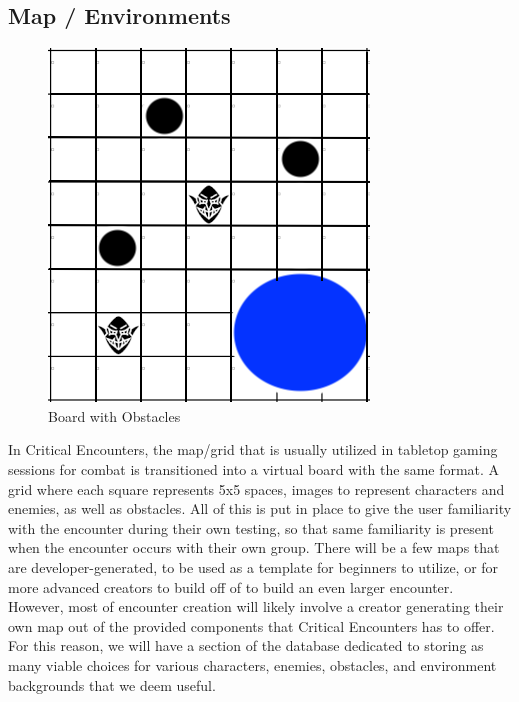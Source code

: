 \documentclass[12pt,a4paper]{report}
\begin{document}
	\newpage
	\subsection{Map / Environments}
		\begin{figure}[H]
		\centering
		\includegraphics[scale=.6]{environment}
		\caption{Board with Obstacles}
		\label{fig: Board with Obstacles}
	\end{figure}
	In Critical Encounters, the map/grid that is usually utilized in tabletop gaming sessions for combat is transitioned into a virtual board with the same format. A grid where each square represents 5x5 spaces, images to represent characters and enemies, as well as obstacles. All of this is put in place to give the user familiarity with the encounter during their own testing, so that same familiarity is present when the encounter occurs with their own group. There will be a few maps that are developer-generated, to be used as a template for beginners to utilize, or for more advanced creators to build off of to build an even larger encounter. However, most of encounter creation will likely involve a creator generating their own map out of the provided components that Critical Encounters has to offer. For this reason, we will have a section of the database dedicated to storing as many viable choices for various characters, enemies, obstacles, and environment backgrounds that we deem useful.
	
	\newpage
\end{document}
